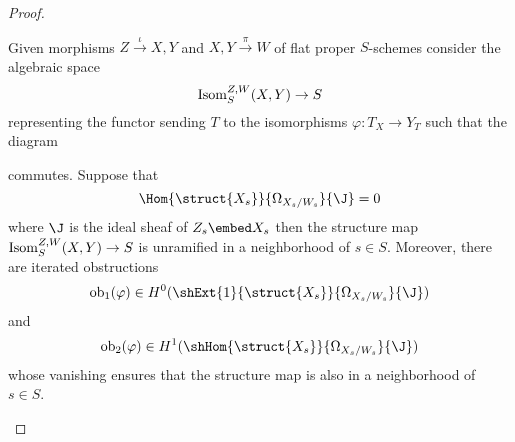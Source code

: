 \documentclass[12pt]{article}
\newcommand{\ob}{\mathrm{ob}}
\begin{document}
\begin{proof}
\begin{lemma}
Given morphisms $Z \xrightarrow{\iota} X,Y$ and $X,Y \xrightarrow{\pi} W$ of flat proper $S$-schemes consider the algebraic space
\[ \mathrm{Isom}_S^{Z,W}(X, Y) \to S \]
representing the functor sending $T$ to the isomorphisms $\varphi : T_X \to Y_T$ such that the diagram
\begin{center}
\end{center}
commutes. Suppose that
\[ \Hom{\struct{X_s}}{\Omega_{X_s/W_s}}{\J} = 0 \]
where $\J$ is the ideal sheaf of $Z_s \embed X_s$
then the structure map $\mathrm{Isom}_S^{Z,W}(X, Y) \to S$ is unramified in a neighborhood of $s \in S$. Moreover, there are iterated obstructions
\[ \ob_1(\varphi) \in H^0(\shExt{1}{\struct{X_s}}{\Omega_{X_s/W_s}}{\J}) \]
and 
\[ \ob_2(\varphi) \in H^1(\shHom{\struct{X_s}}{\Omega_{X_s/W_s}}{\J}) \]
whose vanishing ensures that the structure map is also \etale in a neighborhood of $s \in S$.
\end{lemma}


\end{proof}
\end{document}

